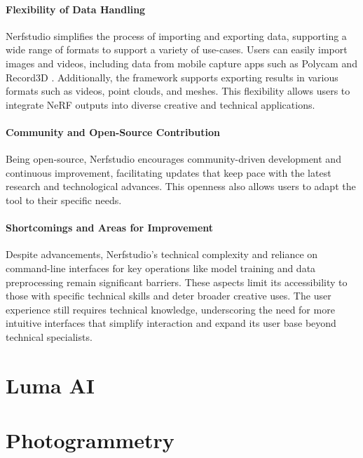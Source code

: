 \paragraph{Flexibility of Data Handling}
Nerfstudio simplifies the process of importing and exporting data, supporting a wide range of formats to support a variety of use-cases.
Users can easily import images and videos, including data from mobile capture apps such as Polycam \cite{noauthor_polycam_nodate} and Record3D \cite{noauthor_record3d_nodate}.
Additionally, the framework supports exporting results in various formats such as videos, point clouds, and meshes.
This flexibility allows users to integrate NeRF outputs into diverse creative and technical applications.

\paragraph{Community and Open-Source Contribution}
Being open-source, Nerfstudio encourages community-driven development and continuous improvement, facilitating updates that keep pace with the latest research and technological advances.
This openness also allows users to adapt the tool to their specific needs.

\paragraph{Shortcomings and Areas for Improvement}

Despite advancements, Nerfstudio's technical complexity and reliance on command-line interfaces for key operations like model training and data preprocessing remain significant barriers.
These aspects limit its accessibility to those with specific technical skills and deter broader creative uses.
The user experience still requires technical knowledge, underscoring the need for more intuitive interfaces that simplify interaction and expand its user base beyond technical specialists.

\section{Luma AI}
\label{sec:related:lmua}

\section{Photogrammetry}
\label{sec:related:photogrammetry}
